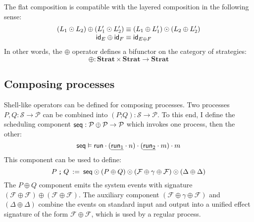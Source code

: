 \begin{theorem}
  The flat composition is compatible
  with the layered composition in the following sense:
  \[
    \begin{array}{r@{}l}
      (L_1 \odot L_2) \oplus (L_1' \odot L_2') & {} \equiv
      (L_1 \oplus L_1') \odot (L_2 \oplus L_2') \\
      \kw{id}_E \oplus \kw{id}_F & {} \equiv \kw{id}_{E \oplus F}
    \end{array}
  \]
  In other words, the $\oplus$ operator defines a bifunctor
  on the category of strategies:
  \[
    \oplus : \mathbf{Strat} \times \mathbf{Strat} \rightarrow \mathbf{Strat}
  \]
\end{theorem}


\subsection{Composing processes}
\label{sec:strat:compose-process}

Shell-like operators can be defined for composing processes.
Two processes $P, Q : \mathcal{S} \rightarrow \mathcal{P}$
can be combined into
$(P \mathbin\texttt{;} Q) : \mathcal{S} \rightarrow \mathcal{P}$.
To this end,
I define the scheduling component
$ \mathsf{seq}  : \mathcal{P} \oplus \mathcal{P} \rightarrow \mathcal{P}$
which invokes one process, then the other:
\[
   \mathsf{seq}  \vDash
   \mathsf{run}  \cdot (\underline{ \mathsf{run} _1} \cdot n) \cdot (\underline{ \mathsf{run} _2} \cdot m) \cdot m
\]
This component can be used to define:
\[
  P \mathbin\texttt{;} Q \: := \:
   \mathsf{seq}  \odot (P \oplus Q)
  \odot (\mathcal{F} \oplus \gamma \oplus \mathcal{F})
  \odot (\Delta \oplus \Delta)
\]
The $P \oplus Q$ component
emits the system events with signature $(\mathcal{F} \oplus \mathcal{F}) \oplus (\mathcal{F} \oplus \mathcal{F})$.
The auxiliary component
$(\mathcal{F} \oplus \gamma \oplus \mathcal{F})$
and
$(\Delta \oplus \Delta)$
combine the events on standard input and output
into a unified effect signature
of the form $\mathcal{F} \oplus \mathcal{F}$,
which is used by a regular process.

